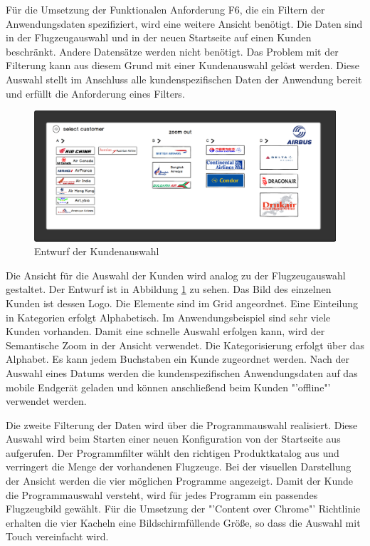 Für die Umsetzung der Funktionalen Anforderung F6, die ein Filtern der Anwendungsdaten spezifiziert, wird eine weitere Ansicht benötigt. Die Daten sind in der Flugzeugauswahl und in der neuen Startseite auf einen Kunden beschränkt. Andere Datensätze werden nicht benötigt.  Das Problem mit der Filterung kann aus diesem Grund mit einer Kundenauswahl gelöst werden. Diese Auswahl stellt im Anschluss alle kundenspezifischen Daten der Anwendung bereit und erfüllt die Anforderung eines Filters. \par 
\begin{figure}
\centering
\includegraphics[width=\hsize]{images/customer_entwurf}
\caption{Entwurf der Kundenauswahl}
\label{customerSketch}
\end{figure}
Die Ansicht für die Auswahl der Kunden wird analog zu der Flugzeugauswahl gestaltet. Der Entwurf ist in Abbildung \ref{customerSketch} zu sehen. Das Bild des einzelnen Kunden ist dessen Logo. Die Elemente sind im Grid angeordnet. Eine Einteilung in Kategorien erfolgt Alphabetisch. Im Anwendungsbeispiel sind sehr viele Kunden vorhanden. Damit eine schnelle Auswahl erfolgen kann, wird der Semantische Zoom in der Ansicht verwendet. Die Kategorisierung erfolgt über das Alphabet. Es kann jedem Buchstaben ein Kunde zugeordnet werden. Nach der Auswahl eines Datums werden die kundenspezifischen Anwendungsdaten auf das mobile Endgerät geladen und können anschließend beim Kunden "'offline"' verwendet werden. \par 

Die zweite Filterung der Daten wird über die Programmauswahl realisiert. Diese Auswahl wird beim Starten einer neuen Konfiguration von der Startseite aus aufgerufen. Der Programmfilter wählt den richtigen Produktkatalog aus und verringert die Menge der vorhandenen Flugzeuge. Bei der visuellen Darstellung der Ansicht werden die vier möglichen Programme angezeigt. Damit der Kunde die Programmauswahl versteht, wird für jedes Programm ein passendes Flugzeugbild gewählt. Für die Umsetzung der "'Content over Chrome"' Richtlinie erhalten die vier Kacheln eine Bildschirmfüllende Größe, so dass die Auswahl mit Touch vereinfacht wird.



